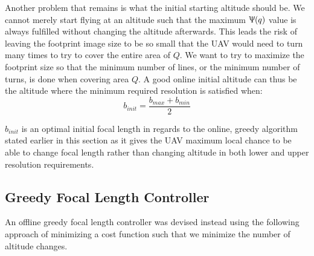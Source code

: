 \documentclass[conference]{IEEEtran}
\theoremstyle{plain}%
\begin{document}
Another problem that remains is what the initial starting altitude should be. We cannot merely start flying at an altitude such that the maximum $\Uppsi(q)$ value is always fulfilled without changing the altitude afterwards. This leads the risk of leaving the footprint image size to be so small that the UAV would need to turn many times to try to cover the entire area of $Q$. We want to try to maximize the footprint size so that the minimum number of lines, or the minimum number of turns, is done when covering area $Q$. A good online initial altitude can thus be the altitude where the minimum required resolution is satisfied when:
\begin{equation} \label{eq:b_init}
b_{init} = \frac{b_{max}+b_{min}}{2}
\end{equation}

$b_{init}$ is an optimal initial focal length in regards to the online, greedy algorithm stated earlier in this section as it gives the UAV maximum local chance to be able to change focal length rather than changing altitude in both lower and upper resolution requirements.

\subsection{Greedy Focal Length Controller}
An offline greedy focal length controller was devised instead using the following approach of minimizing a cost function such that we minimize the number of altitude changes.
\end{document}

